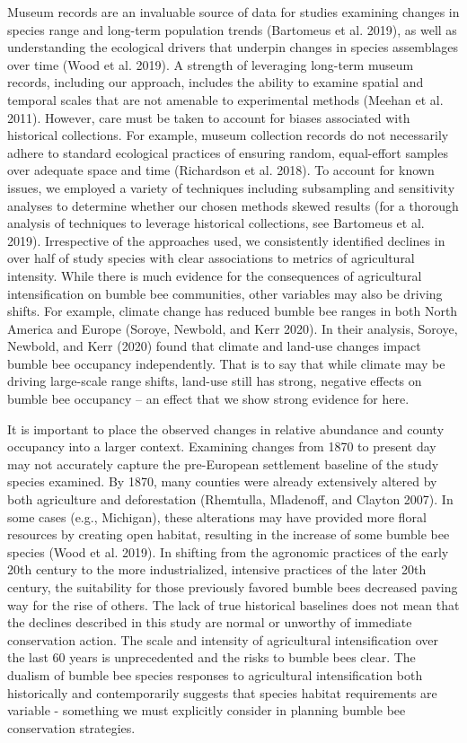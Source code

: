 \documentclass[11pt,]{article}
\begin{document}
Museum records are an invaluable source of data for studies examining
changes in species range and long-term population trends (Bartomeus et
al. 2019), as well as understanding the ecological drivers that underpin
changes in species assemblages over time (Wood et al. 2019). A strength
of leveraging long-term museum records, including our approach, includes
the ability to examine spatial and temporal scales that are not amenable
to experimental methods (Meehan et al. 2011). However, care must be
taken to account for biases associated with historical collections. For
example, museum collection records do not necessarily adhere to standard
ecological practices of ensuring random, equal-effort samples over
adequate space and time (Richardson et al. 2018). To account for known
issues, we employed a variety of techniques including subsampling and
sensitivity analyses to determine whether our chosen methods skewed
results (for a thorough analysis of techniques to leverage historical
collections, see Bartomeus et al. 2019). Irrespective of the approaches
used, we consistently identified declines in over half of study species
with clear associations to metrics of agricultural intensity. While
there is much evidence for the consequences of agricultural
intensification on bumble bee communities, other variables may also be
driving shifts. For example, climate change has reduced bumble bee
ranges in both North America and Europe (Soroye, Newbold, and Kerr
2020). In their analysis, Soroye, Newbold, and Kerr (2020) found that
climate and land-use changes impact bumble bee occupancy independently.
That is to say that while climate may be driving large-scale range
shifts, land-use still has strong, negative effects on bumble bee
occupancy -- an effect that we show strong evidence for here.

It is important to place the observed changes in relative abundance and
county occupancy into a larger context. Examining changes from 1870 to
present day may not accurately capture the pre-European settlement
baseline of the study species examined. By 1870, many counties were
already extensively altered by both agriculture and deforestation
(Rhemtulla, Mladenoff, and Clayton 2007). In some cases (e.g.,
Michigan), these alterations may have provided more floral resources by
creating open habitat, resulting in the increase of some bumble bee
species (Wood et al. 2019). In shifting from the agronomic practices of
the early 20th century to the more industrialized, intensive practices
of the later 20th century, the suitability for those previously favored
bumble bees decreased paving way for the rise of others. The lack of
true historical baselines does not mean that the declines described in
this study are normal or unworthy of immediate conservation action. The
scale and intensity of agricultural intensification over the last 60
years is unprecedented and the risks to bumble bees clear. The dualism
of bumble bee species responses to agricultural intensification both
historically and contemporarily suggests that species habitat
requirements are variable - something we must explicitly consider in
planning bumble bee conservation strategies.
\end{document}
